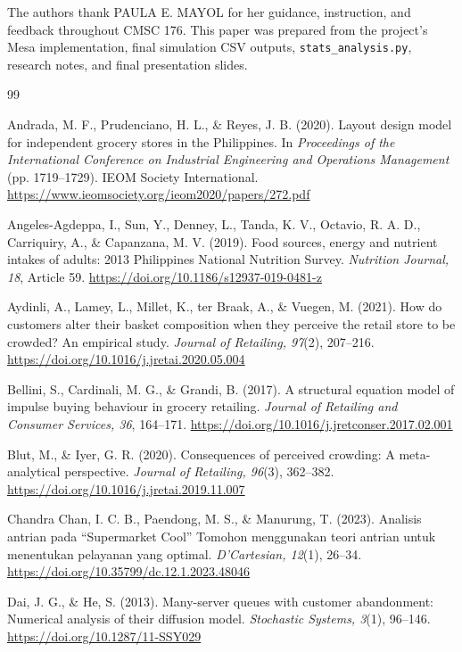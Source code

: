 \documentclass[sigconf,nonacm]{acmart}
\begin{document}
The authors thank PAULA E. MAYOL for her guidance, instruction, and feedback throughout CMSC 176. This paper was prepared from the project's Mesa implementation, final simulation CSV outputs, \texttt{stats\_analysis.py}, research notes, and final presentation slides.

\begin{thebibliography}{99}

Andrada, M. F., Prudenciano, H. L., \& Reyes, J. B. (2020). Layout design model for independent grocery stores in the Philippines. In \emph{Proceedings of the International Conference on Industrial Engineering and Operations Management} (pp. 1719--1729). IEOM Society International. \url{https://www.ieomsociety.org/ieom2020/papers/272.pdf}

Angeles-Agdeppa, I., Sun, Y., Denney, L., Tanda, K. V., Octavio, R. A. D., Carriquiry, A., \& Capanzana, M. V. (2019). Food sources, energy and nutrient intakes of adults: 2013 Philippines National Nutrition Survey. \emph{Nutrition Journal, 18}, Article 59. \url{https://doi.org/10.1186/s12937-019-0481-z}

Aydinli, A., Lamey, L., Millet, K., ter Braak, A., \& Vuegen, M. (2021). How do customers alter their basket composition when they perceive the retail store to be crowded? An empirical study. \emph{Journal of Retailing, 97}(2), 207--216. \url{https://doi.org/10.1016/j.jretai.2020.05.004}

Bellini, S., Cardinali, M. G., \& Grandi, B. (2017). A structural equation model of impulse buying behaviour in grocery retailing. \emph{Journal of Retailing and Consumer Services, 36}, 164--171. \url{https://doi.org/10.1016/j.jretconser.2017.02.001}

Blut, M., \& Iyer, G. R. (2020). Consequences of perceived crowding: A meta-analytical perspective. \emph{Journal of Retailing, 96}(3), 362--382. \url{https://doi.org/10.1016/j.jretai.2019.11.007}

Chandra Chan, I. C. B., Paendong, M. S., \& Manurung, T. (2023). Analisis antrian pada ``Supermarket Cool'' Tomohon menggunakan teori antrian untuk menentukan pelayanan yang optimal. \emph{D'Cartesian, 12}(1), 26--34. \url{https://doi.org/10.35799/dc.12.1.2023.48046}

Dai, J. G., \& He, S. (2013). Many-server queues with customer abandonment: Numerical analysis of their diffusion model. \emph{Stochastic Systems, 3}(1), 96--146. \url{https://doi.org/10.1287/11-SSY029}


\end{thebibliography}
\end{document}
